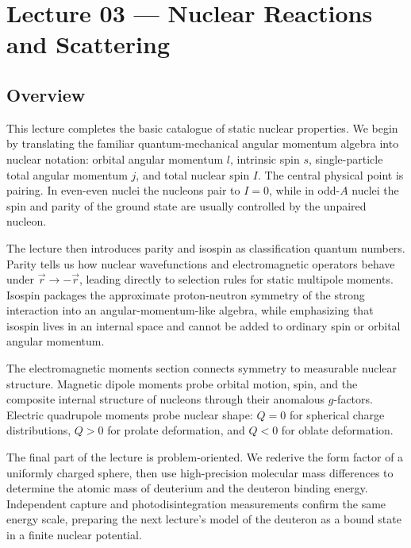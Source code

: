 
\section{Lecture 03 — Nuclear Reactions and Scattering}
\label{sec:lec03}
\date{28 April 2026}


\subsection*{Overview}
This lecture completes the basic catalogue of static nuclear properties.  We begin by translating the familiar quantum-mechanical angular momentum algebra into nuclear notation: orbital angular momentum $l$, intrinsic spin $s$, single-particle total angular momentum $j$, and total nuclear spin $I$.  The central physical point is pairing.  In even-even nuclei the nucleons pair to $I=0$, while in odd-$A$ nuclei the spin and parity of the ground state are usually controlled by the unpaired nucleon.

The lecture then introduces parity and isospin as classification quantum numbers.  Parity tells us how nuclear wavefunctions and electromagnetic operators behave under $\vec{r}\to-\vec{r}$, leading directly to selection rules for static multipole moments.  Isospin packages the approximate proton-neutron symmetry of the strong interaction into an angular-momentum-like algebra, while emphasizing that isospin lives in an internal space and cannot be added to ordinary spin or orbital angular momentum.

The electromagnetic moments section connects symmetry to measurable nuclear structure.  Magnetic dipole moments probe orbital motion, spin, and the composite internal structure of nucleons through their anomalous $g$-factors.  Electric quadrupole moments probe nuclear shape: $Q=0$ for spherical charge distributions, $Q>0$ for prolate deformation, and $Q<0$ for oblate deformation.

The final part of the lecture is problem-oriented.  We rederive the form factor of a uniformly charged sphere, then use high-precision molecular mass differences to determine the atomic mass of deuterium and the deuteron binding energy.  Independent capture and photodisintegration measurements confirm the same energy scale, preparing the next lecture's model of the deuteron as a bound state in a finite nuclear potential.


